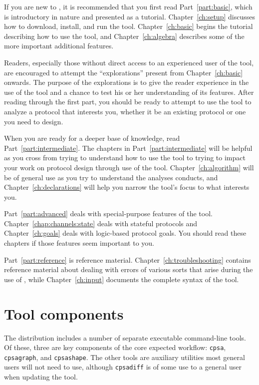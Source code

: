 If you are new to {\cpsa}, it is recommended that you first read
Part~\ref{part:basic}, which is introductory in nature and presented
as a tutorial.  Chapter~\ref{ch:setup} discusses how to download,
install, and run the tool.  Chapter~\ref{ch:basic} begins the tutorial
describing how to use the tool, and Chapter~\ref{ch:algebra} describes
some of the more important additional features.

Readers, especially those without direct access to an experienced user
of the tool, are encouraged to attempt the ``explorations'' present
from Chapter~\ref{ch:basic} onwards.  The purpose of the explorations
is to give the reader experience in the use of the tool and a chance
to test his or her understanding of its features.  After reading
through the first part, you should be ready to attempt to use the tool
to analyze a protocol that interests you, whether it be an existing
protocol or one you need to design.

When you are ready for a deeper base of knowledge, read
Part~\ref{part:intermediate}.  The chapters in
Part~\ref{part:intermediate} will be helpful as you cross from trying
to understand how to use the tool to trying to impact your work on
protocol design through use of the tool.  Chapter~\ref{ch:algorithm}
will be of general use as you try to understand the analyses {\cpsa}
conducts, and Chapter~\ref{ch:declarations} will help you narrow the
tool's focus to what interests you.

Part~\ref{part:advanced} deals with special-purpose features of the tool.
Chapter~\ref {chap:channels:state} deals with stateful protocols and
Chapter~\ref{ch:goals} deals with logic-based protocol goals.  You
should read these chapters if those features seem important to you.

Part~\ref{part:reference} is reference material.
Chapter~\ref{ch:troubleshooting} contains reference material about
dealing with errors of various sorts that arise during the use of
{\cpsa}, while Chapter~\ref{ch:input} documents the complete syntax of
the tool.

\section{Tool components}

The distribution includes a number of separate executable command-line
tools.  Of these, three are key components of the core expected
workflow: \texttt{cpsa}, \texttt{cpsagraph}, and \texttt{cpsashape}.
The other tools are auxiliary utilities most general users will not
need to use, although \texttt{cpsadiff} is of some use to a general
user when updating the tool.

